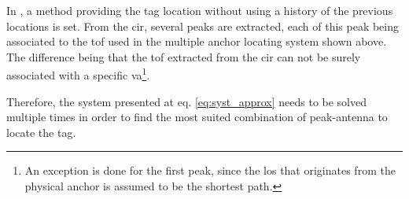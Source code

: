 In \cite{jespersen2018indoor}, a method providing the tag location without using a history of the previous locations is set. From the \gls{cir}, several peaks are extracted, each of this peak being associated to the \gls{tof} used in the multiple anchor locating system shown above. The difference being that the \gls{tof} extracted from the \gls{cir} can not be surely associated with a specific \gls{va}\footnote{An exception is done for the first peak, since the \gls{los} that originates from the physical anchor is assumed to be the shortest path.}. 
\vspace{2mm}

Therefore, the system presented at eq. \ref{eq:syst_approx} needs to be solved multiple times in order to find the most suited combination of peak-antenna to locate the tag.
